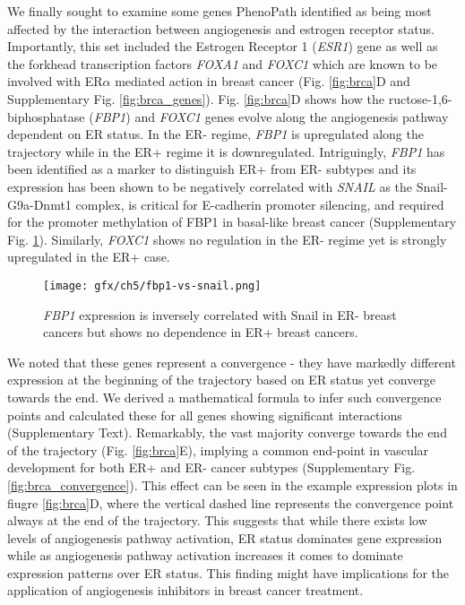 We finally sought to examine some genes PhenoPath identified as being most affected by the interaction between angiogenesis and estrogen receptor status.
Importantly, this set included the Estrogen Receptor 1 (\emph{ESR1})
gene as well as the forkhead transcription factors \emph{FOXA1} and \emph{FOXC1} which are known to be involved with ER$\alpha$ mediated action in breast cancer \cite{lam2013forkhead,yu2016foxc1} (Fig. \ref{fig:brca}D and Supplementary Fig. \ref{fig:brca_genes}).
Fig. \ref{fig:brca}D shows how the  ructose-1,6-biphosphatase (\emph{FBP1}) and \emph{FOXC1} genes evolve along the angiogenesis pathway dependent on ER status. In the ER- regime, \emph{FBP1} is upregulated along the trajectory while in the ER+ regime it is downregulated. Intriguingly, \emph{FBP1} has been identified as a marker to distinguish ER+ from ER- subtypes and its expression has been shown to be negatively correlated with \emph{SNAIL} as the Snail-G9a-Dnmt1 complex, is critical for E-cadherin promoter silencing, and required for the promoter methylation of FBP1 in basal-like breast cancer (Supplementary Fig. \ref{fig:fbp1-vs-snail}).\cite{dong2013loss} Similarly, \emph{FOXC1} shows no regulation in the ER- regime yet is strongly upregulated in the ER+ case.

\begin{figure}
  \centering
   \texttt{[image: gfx/ch5/fbp1-vs-snail.png]}
   \caption{\emph{FBP1} expression is inversely correlated with Snail in ER- breast cancers but shows no dependence in ER+ breast cancers.}
	\label{fig:fbp1-vs-snail}
\end{figure}

We noted that these genes represent a convergence - they have markedly different expression at the beginning of the trajectory based on ER status yet converge towards the end. We derived a mathematical formula to infer such convergence points and calculated these for all genes showing significant interactions (Supplementary Text). Remarkably, the vast majority converge towards the end of the trajectory (Fig. \ref{fig:brca}E), implying a common end-point in vascular development for both ER+ and ER- cancer subtypes (Supplementary Fig. \ref{fig:brca_convergence}).
This effect can be seen in the example expression plots in fiugre \ref{fig:brca}D, where the vertical dashed line represents the convergence point always at the end of the trajectory.
This suggests that while there exists low levels of angiogenesis pathway activation, ER status dominates gene expression while as angiogenesis pathway activation increases it comes to dominate expression patterns over ER status. This finding might have implications for the application of angiogenesis inhibitors in breast cancer treatment.

